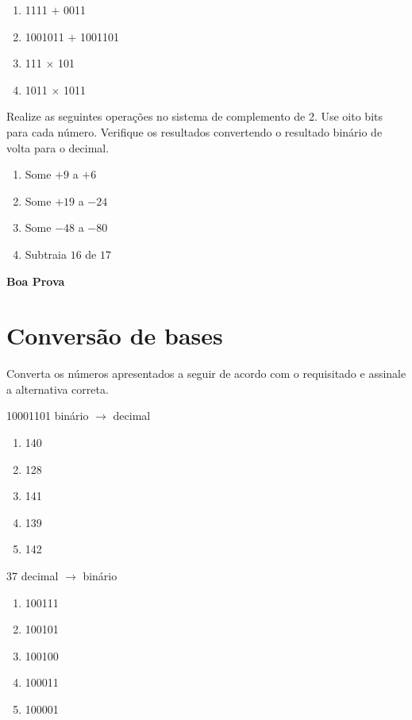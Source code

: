 \begin{enumerate}[1]
\begin{enumerate}[(1)]
\item 1111 $+$ 0011
\item 1001011 $+$ 1001101
\item 111 $\times$ 101
\item 1011 $\times$ 1011
\end{enumerate}

 Realize as seguintes operações no sistema de complemento de
2. Use oito bits para cada número. Verifique os resultados convertendo
o resultado binário de volta para o decimal.

\begin{enumerate}
\item Some $+9$ a $+6$
\item Some $+19$ a $-24$
\item Some $-48$ a $-80$
\item Subtraia $16$ de $17$
\end{enumerate}

\end{enumerate}

\vfill

\hfill{\large\bf Boa Prova}

\fi

\section*{Conversão de bases} Converta os números apresentados a seguir de acordo com o
requisitado e assinale a alternativa correta.

\begin{minipage}{.45\textwidth}
 \vfill
{\large 10001101} binário $\rightarrow$ decimal
\begin{enumerate}[\itemlabel]
\item 140
\item 128
\item 141 %
\item 139
\item 142
\end{enumerate}
\end{minipage}\hspace{.075\textwidth}
\begin{minipage}{.4\textwidth}
{\large 37} decimal $\rightarrow$ binário
\begin{enumerate}[\itemlabel]
\item 100111
\item 100101 %
\item 100100
\item 100011
\item 100001
\end{enumerate}
\end{minipage}

